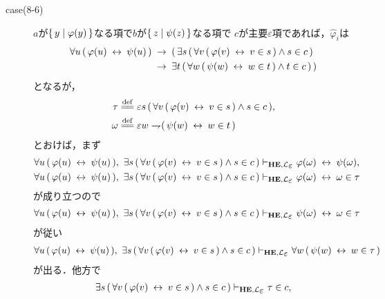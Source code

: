 \begin{metaprf}
\begin{description}
\begin{description}
					\item[case(8-6)] $a$が$\{\, y \mid \varphi(y)\, \}$なる項で$b$が$\{\, z \mid \psi(z)\, \}$なる項で
						$c$が主要$\varepsilon$項であれば，$\widehat{\varphi}_{i}$は
						\begin{align}
							\forall u\, (\, \varphi(u) \hspace{0.25em}\leftrightarrow\hspace{0.25em} \psi(u)\, ) 
							&\hspace{0.25em}\rightarrow\hspace{0.25em} (\, \exists s\, (\, \forall v\, (\, \varphi(v) \hspace{0.25em}\leftrightarrow\hspace{0.25em} v \in s\, ) \wedge s \in c\, ) \\
							&\hspace{0.25em}\rightarrow\hspace{0.25em} \exists t\, (\, \forall w\, (\, \psi(w) \hspace{0.25em}\leftrightarrow\hspace{0.25em} w \in t\, ) \wedge t \in c\, )\, )
						\end{align}
						となるが，
						\begin{align}
							\tau &\defeq \varepsilon s\, (\, \forall v\, (\, \varphi(v) \lrarrow v \in s\, ) \wedge s \in c\, ), \\
							\omega &\defeq \varepsilon w \negation (\, \psi(w) \lrarrow w \in t\, )
						\end{align}
						とおけば，まず
						\begin{align}
							\forall u\, (\, \varphi(u) \lrarrow \psi(u)\, ),\ 
							\exists s\, (\, \forall v\, (\, \varphi(v) \lrarrow v \in s\, ) \wedge s \in c\, )
							&\provable{\mbox{{\bf HE}},\lang{\varepsilon}} \varphi(\omega) \lrarrow \psi(\omega), \\
							\forall u\, (\, \varphi(u) \lrarrow \psi(u)\, ),\ 
							\exists s\, (\, \forall v\, (\, \varphi(v) \lrarrow v \in s\, ) \wedge s \in c\, )
							&\provable{\mbox{{\bf HE}},\lang{\varepsilon}} \varphi(\omega) \lrarrow \omega \in \tau
						\end{align}
						が成り立つので
						\begin{align}
							\forall u\, (\, \varphi(u) \lrarrow \psi(u)\, ),\ 
							\exists s\, (\, \forall v\, (\, \varphi(v) \lrarrow v \in s\, ) \wedge s \in c\, )
							\provable{\mbox{{\bf HE}},\lang{\varepsilon}} \psi(\omega) \lrarrow \omega \in \tau
						\end{align}
						が従い
						\begin{align}
							\forall u\, (\, \varphi(u) \lrarrow \psi(u)\, ),\ 
							\exists s\, (\, \forall v\, (\, \varphi(v) \lrarrow v \in s\, ) \wedge s \in c\, )
							\provable{\mbox{{\bf HE}},\lang{\varepsilon}} \forall w\, (\, \psi(w) \lrarrow w \in \tau\, )
						\end{align}
						が出る．他方で
						\begin{align}
							\exists s\, (\, \forall v\, (\, \varphi(v) \lrarrow v \in s\, ) \wedge s \in c\, )
							\provable{\mbox{{\bf HE}},\lang{\varepsilon}} \tau \in c, \\

\end{align}
\end{description}
\end{description}
\end{metaprf}
